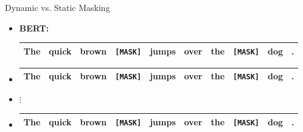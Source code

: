 \begin{frame}{Dynamic vs. Static Masking}

\vfill

\begin{itemize}
	\item \normalsize \textbf{BERT:}
			\footnotesize
\begin{tabular}{|cccccccccc|}
\hline
The & quick & brown & \cellcolor{blue!65}\texttt{[MASK]} & jumps & over & the & \cellcolor{blue!65}\texttt{[MASK]} & dog & . \\
\hline
\end{tabular}
	\item[] \footnotesize
\begin{tabular}{|cccccccccc|}
\hline
The & quick & brown & \cellcolor{blue!65}\texttt{[MASK]} & jumps & over & the & \cellcolor{blue!65}\texttt{[MASK]} & dog & . \\
\hline
\end{tabular}
	\item[] \begin{center}$\vdots$\end{center}
	\item[] \footnotesize
\begin{tabular}{|cccccccccc|}
\hline
The & quick & brown & \cellcolor{blue!65}\texttt{[MASK]} & jumps & over & the & \cellcolor{blue!65}\texttt{[MASK]} & dog & . \\
\hline
\end{tabular}
\end{itemize}

\vspace{.75cm}


\end{frame}
